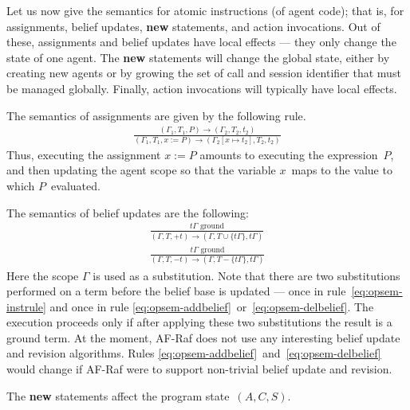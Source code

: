 \documentclass[a4paper,12pt,oneside,fleqn]{book} %
\begin{document}
Let us now give the semantics for atomic instructions (of agent code); that
is, for assignments, belief updates, {\bf new} statements, and action
invocations.  Out of these, assignments and belief updates have local
effects --- they only change the state of one agent. The {\bf new}
statements will change the global state, either by creating new agents or
by growing the set of call and session identifier that must be managed
globally. Finally, action invocations will typically have local effects.

The semantics of assignments are given by the following rule.
\begin{align}
\frac
  {(\Gamma_1,T_1,P)\to(\Gamma_2,T_2,t_2)}
  {(\Gamma_1,T_1,x:=P)\to(\Gamma_2[x\mapsto t_2],T_2,t_2)}
\end{align}
Thus, executing the assignment $x:=P$ amounts to executing the
expression~$P$, and then updating the agent scope so that the variable
$x$~maps to the value to which $P$~evaluated.

The semantics of belief updates are the following:
\begin{align}
\frac
  {\text{$t\Gamma$ ground}}
  {(\Gamma,T,+t)\to(\Gamma,T\cup\{t\Gamma\}, t\Gamma)}
  \label{eq:opsem-addbelief}
\\[1ex]
\frac
  {\text{$t\Gamma$ ground}}
  {(\Gamma,T,-t)\to(\Gamma,T-\{t\Gamma\}, t\Gamma)}
  \label{eq:opsem-delbelief}
\end{align}
Here the scope $\Gamma$ is used as a substitution. Note that there are two
substitutions performed on a term before the belief base is updated ---
once in rule~\eqref{eq:opsem-instrule} and once in rule
\eqref{eq:opsem-addbelief}~or~\eqref{eq:opsem-delbelief}. The execution
proceeds only if after applying these two substitutions the result is a
ground term. At the moment, AF-Raf does not use any interesting belief
update and revision algorithms. Rules
\eqref{eq:opsem-addbelief}~and~\eqref{eq:opsem-delbelief} would change if
AF-Raf were to support non-trivial belief update and revision.

The {\bf new} statements affect the program state~$(A,C,S)$.
\end{document}
